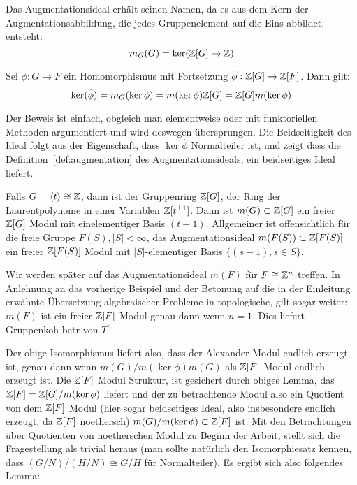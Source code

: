 Das Augmentationsideal erhält seinen Namen, da es aus dem Kern der Augmentationsabbildung, die jedes Gruppenelement auf die Eins abbildet, entsteht:
\[
	m_G(G) = \ker(\mathbb{Z}[G] \to \mathbb{Z})
\]

\begin{lem}
	Sei $\phi:G \to F$ ein Homomorphismus mit Fortsetzung $\hat \phi: \mathbb{Z}[G] \to \mathbb{Z}[F]$. Dann gilt:
	\[
		\ker(\hat\phi) = m_G(\ker\phi)= m(\ker\phi) \mathbb{Z}[G] = \mathbb{Z}[G] m(\ker\phi) 
	\]
\end{lem}
Der Beweis ist einfach, obgleich man elementweise oder mit funktoriellen Methoden argumentiert und wird deswegen übersprungen. Die Beidseitigkeit des Ideal folgt aus der Eigenschaft, dass $\ker\hat\phi$ Normalteiler ist, und zeigt dass die Definition~\ref{def:augmentation} des Augmentationsideals, ein beidseitiges Ideal liefert.


\begin{bsp}
	Falls $G=\langle t \rangle \cong \mathbb{Z}$, dann ist der Gruppenring $\mathbb{Z} [G]$, der Ring der Laurentpolynome in einer Variablen $\mathbb{Z}[t^{\pm 1}]$. Dann ist $m(G) \subset \mathbb{Z}[G]$ ein freier $\mathbb{Z}[G]$ Modul mit einelementiger Basis $(t-1)$. Allgemeiner ist offensichtlich für die freie Gruppe $F(S), |S| < \infty$, das Augmentationsideal $m(F(S)) \subset \mathbb{Z}[F(S)]$ ein freier $\mathbb{Z}[F(S)]$ Modul mit $|S|$-elementiger Basis $\{(s-1), s \in S\}$.
\end{bsp}

\begin{bsp}
	Wir werden später auf das Augmentationsideal $m(F)$ für $F\cong \mathbb{Z}^n$ treffen. In Anlehnung an das vorherige Beispiel und der Betonung auf die in der Einleitung erwähnte Übersetzung algebraischer Probleme in topologische, gilt sogar weiter: $m(F)$ ist ein freier $\mathbb{Z}[F]$-Modul genau dann wenn $n=1$. Dies liefert Gruppenkoh betr von $T^n$ 
\end{bsp}


Der obige Isomorphismus liefert also, dass der Alexander Modul endlich erzeugt ist, genau dann wenn $m(G)/m(\ker\phi)m(G)$ als $\mathbb{Z}[F]$ Modul endlich erzeugt ist. Die $\mathbb{Z}[F]$ Modul Struktur, ist gesichert durch obiges Lemma, das $\mathbb{Z}[F]=\mathbb{Z}[G]/m(\ker\phi)$ liefert und der zu betrachtende Modul also ein Quotient von dem $\mathbb{Z}[F]$ Modul (hier sogar beidseitiges Ideal, also insbesondere endlich erzeugt, da $\mathbb{Z}[F]$ noethersch) $m(G)/m(\ker\phi) \subset \mathbb{Z}[F]$ ist. Mit den Betrachtungen über Quotienten von noetherschen Modul zu Beginn der Arbeit, stellt sich die Fragestellung als trivial heraus (man sollte natürlich den Isomorphiesatz kennen, dass $(G/N)/(H/N)\cong G/H$ für Normalteiler). Es ergibt sich also folgendes Lemma:

